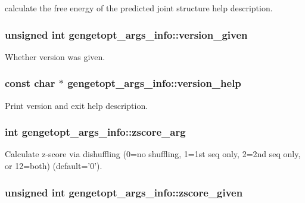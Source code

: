 calculate the free energy of the predicted joint structure help description. 

\hypertarget{structgengetopt__args__info_ad4953a2130b2f8b94a3a687014f278e1}{
\subsubsection[{version\+\_\+given}]{\setlength{\rightskip}{0pt plus 5cm}unsigned int gengetopt\+\_\+args\+\_\+info\+::version\+\_\+given}}\label{structgengetopt__args__info_ad4953a2130b2f8b94a3a687014f278e1}


Whether version was given. 

\hypertarget{structgengetopt__args__info_adb4fc9ee66c499d4225d6f6eefbd8c09}{
\subsubsection[{version\+\_\+help}]{\setlength{\rightskip}{0pt plus 5cm}const char $\ast$ gengetopt\+\_\+args\+\_\+info\+::version\+\_\+help}}\label{structgengetopt__args__info_adb4fc9ee66c499d4225d6f6eefbd8c09}


Print version and exit help description. 

\hypertarget{structgengetopt__args__info_a74d8c0d931f3466ef58a09fbabe05fa3}{
\subsubsection[{zscore\+\_\+arg}]{\setlength{\rightskip}{0pt plus 5cm}int gengetopt\+\_\+args\+\_\+info\+::zscore\+\_\+arg}}\label{structgengetopt__args__info_a74d8c0d931f3466ef58a09fbabe05fa3}


Calculate z-\/score via dishuffling (0=no shuffling, 1=1st seq only, 2=2nd seq only, or 12=both) (default='0'). 

\hypertarget{structgengetopt__args__info_ae7d88b70fcb65c4b63f1f026c8cfa47e}{
\subsubsection[{zscore\+\_\+given}]{\setlength{\rightskip}{0pt plus 5cm}unsigned int gengetopt\+\_\+args\+\_\+info\+::zscore\+\_\+given}}\label{structgengetopt__args__info_ae7d88b70fcb65c4b63f1f026c8cfa47e}


